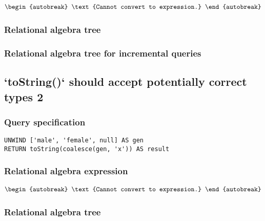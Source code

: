 \begin{align*}
\begin{autobreak}
\text{Cannot convert to expression.}
\end{autobreak}
\end{align*}

\subsubsection*{Relational algebra tree}


\subsubsection*{Relational algebra tree for incremental queries}


\subsection{`toString()` should accept potentially correct types 2}

\subsubsection*{Query specification}

\begin{lstlisting}
UNWIND ['male', 'female', null] AS gen
RETURN toString(coalesce(gen, 'x')) AS result
\end{lstlisting}

\subsubsection*{Relational algebra expression}

\begin{align*}
\begin{autobreak}
\text{Cannot convert to expression.}
\end{autobreak}
\end{align*}

\subsubsection*{Relational algebra tree}


